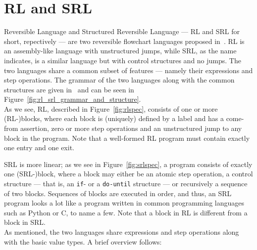 
\section*{RL and SRL}
%
\noindent Reversible Language and Structured Reversible Language --- RL and SRL for short, repectively --- are two reversible flowchart languages proposed in~\cite{REV}. RL is an assembly-like language with unstructured jumps, while SRL, as the name indicates, is a similar language but with control structures and no jumps. The two languages share a common subset of features --- namely their expressions and step operations. The grammar of the two languages along with the common structures are given in~\cite[p.~99]{REV} and can be seen in Figure~\ref{fig:rl_srl_grammar_and_structure}.\\

\noindent As we see, RL, described in Figure~\ref{fig:rlspec}, consists of one or more (RL-)blocks, where each block is (uniquely) defined by a label and has a come-from assertion, zero or more step operations and an unstructured jump to any block in the program. Note that a well-formed RL program must contain exactly one entry and one exit.

SRL is more linear; as we see in Figure~\ref{fig:srlspec}, a program consists of exactly one (SRL-)block, where a block may either be an atomic step operation, a control structure --- that is, an \texttt{if}- or a \texttt{do-until} structure --- or recursively a sequence of two blocks. Sequences of blocks are executed in order, and thus, an SRL program looks a lot like a program written in common programming languages such as Python or C, to name a few. Note that a block in RL is different from a block in SRL.\\

\noindent As mentioned, the two languages share expressions and step operations along with the basic value types. A brief overview follows:\\

